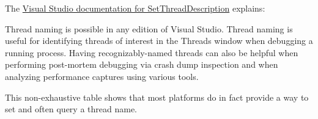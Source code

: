 \documentclass{wg21}
\begin{document}
The \href{https://docs.microsoft.com/en-us/visualstudio/debugger/how-to-set-a-thread-name-in-native-code?view=vs-2019}{Visual Studio documentation for SetThreadDescription} explains:

\begin{quoteblock}
Thread naming is possible in any edition of Visual Studio. Thread naming is useful for identifying threads of interest in the Threads window when debugging a running process. Having recognizably-named threads can also be helpful when performing post-mortem debugging via crash dump inspection and when analyzing performance captures using various tools.
\end{quoteblock}

This non-exhaustive table shows that most platforms do in fact provide a way to set and often query a thread name.
\end{document}
